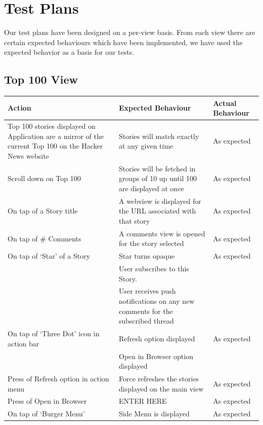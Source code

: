 \documentclass[11pt]{article}
\begin{document}
\section*{Test Plans}

Our test plans have been designed on a per-view basis. From each view there are certain expected behaviours which have been implemented, we have used the expected behavior as a basis for our tests.

\subsection*{Top 100 View}

\begin{center}
    \begin{tabular}{ | p{5cm} | p{5cm} | p{5cm} |}
    \hline
    \textbf{Action} & \textbf{Expected Behaviour} & \textbf{Actual Behaviour} \\
    \hline
    Top 100 stories displayed on Application are a mirror of the current Top 100 on the Hacker News website & Stories will match exactly at any given time & As expected   \\ 	\hline
    Scroll down on Top 100 & Stories will be fetched in groups of 10 up until 100 are displayed at once & As expected \\ 
    \hline
    On tap of a Story title & A webview is displayed for the URL associated with that story & As expected \\
    \hline
	On tap of \# Comments & A comments view is opened for the story selected & As expected \\
	\hline
	
	On tap of ‘Star' of a Story & Star turns opaque & As expected \\ & User subscribes to this Story. & \\ & User receives push notifications on any new comments for the subscribed thread & \\
	\hline
	On tap of ‘Three Dot' icon in action bar & Refresh option displayed & As expected \\ & Open in Browser option displayed & \\
	\hline
	Press of Refresh option in action menu & Force refreshes the stories displayed on the main view & As expected \\
	\hline
	Press of Open in Browser & ENTER HERE & As expected \\
	\hline
	On tap of ‘Burger Menu' & Side Menu is displayed & As expected \\
	\hline
    \end{tabular}
\end{center}
\end{document}
